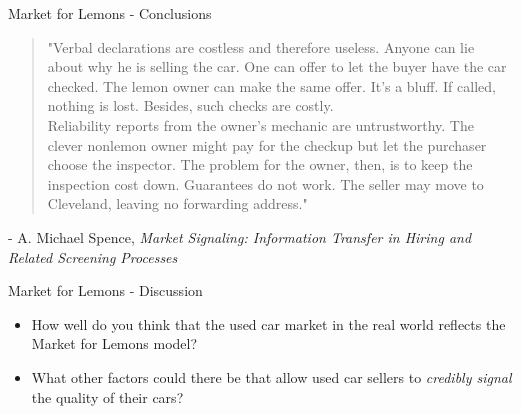 
\begin{frame}{Market for Lemons - Conclusions}
  \begin{quote}
    \small{
    "Verbal declarations are costless and therefore useless. Anyone can lie about why he is selling the car. 
    One can offer to let the buyer have the car checked. The lemon owner can make the same offer. It’s a bluff. If called, nothing is lost. Besides, such checks are costly. \\
    Reliability reports from the owner’s mechanic are untrustworthy. The clever nonlemon owner might pay for the checkup but let the purchaser choose the inspector. The problem for the owner, then, is to keep the inspection cost down. 
    Guarantees do not work. The seller may move to Cleveland, leaving no forwarding address." 
    }
  \end{quote} 
   \footnotesize{- A. Michael Spence, \textit{Market Signaling: Information Transfer in Hiring and Related Screening Processes}}
\end{frame}


\begin{frame}{Market for Lemons - Discussion}
  \begin{itemize}
  \item How well do you think that the used car market in the real world  
  reflects the Market for Lemons model?
  \item What other factors could there be that allow used car sellers 
  to \textit{credibly signal} the quality of their cars?
  \end{itemize}
\end{frame}
